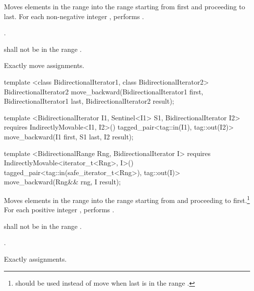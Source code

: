 \begin{itemdescr}
\pnum
\effects
Moves elements in the range 
into the range 
starting from first and proceeding to last.
For each non-negative integer
,
performs
 .

\pnum
\returns
{}.

\pnum
\requires
{}
shall not be in the range
.

\pnum
\complexity
Exactly
move assignments.
\end{itemdescr}

%
\begin{removedblock}
\begin{itemdecl}
template <class BidirectionalIterator1, class BidirectionalIterator2>
  BidirectionalIterator2
    move_backward(BidirectionalIterator1 first,
                  BidirectionalIterator1 last,
                  BidirectionalIterator2 result);
\end{itemdecl}
\end{removedblock}
\begin{addedblock}
\begin{itemdecl}
template <BidirectionalIterator I1, Sentinel<I1> S1, BidirectionalIterator I2>
  requires IndirectlyMovable<I1, I2>()
  tagged_pair<tag::in(I1), tag::out(I2)>
    move_backward(I1 first, S1 last, I2 result);

template <BidirectionalRange Rng, BidirectionalIterator I>
  requires IndirectlyMovable<iterator_t<Rng>, I>()
  tagged_pair<tag::in(safe_iterator_t<Rng>), tag::out(I)>
    move_backward(Rng&& rng, I result);
\end{itemdecl}
\end{addedblock}

\begin{itemdescr}
\pnum
\effects
Moves elements in the range 
into the
range 
starting from
and proceeding to first.\footnote{
should be used instead of move when last
is in
the range
.}
For each positive integer
,
performs
.

\pnum
\requires
{}
shall not be in the range
.

\pnum
\returns
{}.

\pnum
\complexity
Exactly
assignments.
\end{itemdescr}

